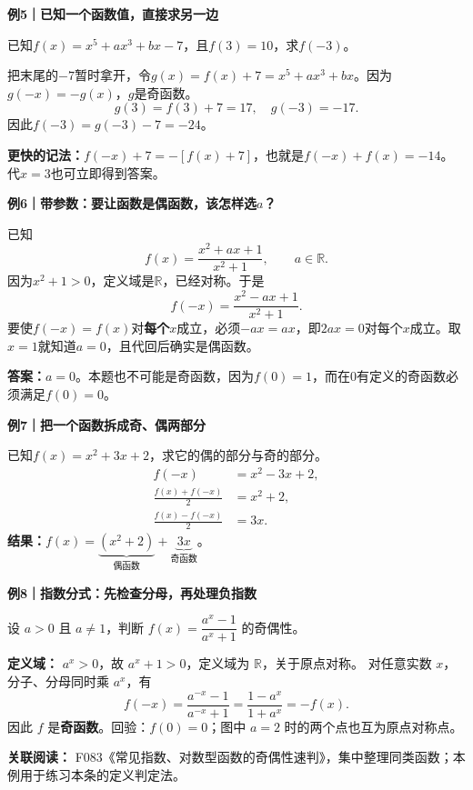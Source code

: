 \clearpage
\begin{examplebox}
\textbf{例5｜已知一个函数值，直接求另一边}



已知$f(x)=x^5+ax^3+bx-7$，且$f(3)=10$，求$f(-3)$。

把末尾的$-7$暂时拿开，令$g(x)=f(x)+7=x^5+ax^3+bx$。因为$g(-x)=-g(x)$，$g$是奇函数。
\[
g(3)=f(3)+7=17,\quad g(-3)=-17.
\]
因此$f(-3)=g(-3)-7=\boxed{-24}$。

\textbf{更快的记法：}$f(-x)+7=-[f(x)+7]$，也就是$f(-x)+f(x)=-14$。代$x=3$也可立即得到答案。

\medskip
\end{examplebox}
\clearpage
\begin{examplebox}
\textbf{例6｜带参数：要让函数是偶函数，该怎样选$a$？}



已知
\[
f(x)=\frac{x^2+ax+1}{x^2+1},\qquad a\in\mathbb R.
\]
因为$x^2+1>0$，定义域是$\mathbb R$，已经对称。于是
\[
f(-x)=\frac{x^2-ax+1}{x^2+1}.
\]
要使$f(-x)=f(x)$对\textbf{每个}$x$成立，必须$-ax=ax$，即$2ax=0$对每个$x$成立。取$x=1$就知道$a=0$，且代回后确实是偶函数。

\textbf{答案：}$\boxed{a=0}$。本题也不可能是奇函数，因为$f(0)=1$，而在$0$有定义的奇函数必须满足$f(0)=0$。

\medskip
\end{examplebox}
\clearpage
\begin{examplebox}
\textbf{例7｜把一个函数拆成奇、偶两部分}



已知$f(x)=x^2+3x+2$，求它的偶的部分与奇的部分。
\[
\begin{aligned}
f(-x)&=x^2-3x+2,\\
\frac{f(x)+f(-x)}2&=x^2+2,\\
\frac{f(x)-f(-x)}2&=3x.
\end{aligned}
\]
\textbf{结果：}$f(x)=\underbrace{(x^2+2)}_{\text{偶函数}}+\underbrace{3x}_{\text{奇函数}}$。
\end{examplebox}
\clearpage
\begin{examplebox}
\textbf{例8｜指数分式：先检查分母，再处理负指数}

设 $a>0$ 且 $a\ne1$，判断 $f(x)=\dfrac{a^x-1}{a^x+1}$ 的奇偶性。

\textbf{定义域：} $a^x>0$，故 $a^x+1>0$，定义域为 $\mathbb R$，关于原点对称。
对任意实数 $x$，分子、分母同时乘 $a^x$，有
\[
f(-x)=\frac{a^{-x}-1}{a^{-x}+1}
=\frac{1-a^x}{1+a^x}=-f(x).
\]
因此 $f$ 是\textbf{奇函数}。回验：$f(0)=0$；图中 $a=2$ 时的两个点也互为原点对称点。

\textbf{关联阅读：} F083《常见指数、对数型函数的奇偶性速判》，集中整理同类函数；本例用于练习本条的定义判定法。
\end{examplebox}
